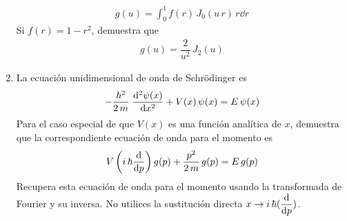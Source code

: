 \begin{enumerate}
\begin{align*}
g(u) = \int_{0}^{1} f(r) \, J_{0} (u \, r) \, r \dd{r}
\end{align*}
Si $f(r) = 1 - r^{2}$, demuestra que
\begin{align*}
g(u) = \dfrac{2}{u^{2}} \, J_{2}(u)
\end{align*}
\item La ecuación unidimensional de onda de Schrödinger es
\begin{align*}
- \dfrac{\hbar^{2}}{2 \, m} \; \dv[2]{\psi(x)}{x} +  V(x) \, \psi(x) = E \, \psi (x)
\end{align*}
Para el caso especial de que $V(x)$ es una función analítica de $x$, demuestra que la correspondiente ecuación de onda para el momento es
\begin{align*}
V \left( i \, \hbar \dv{p} \right) g(p) + \dfrac{p^{2}}{2 \, m} \, g(p) =  E \, g(p)
\end{align*}
Recupera esta ecuación de onda para el momento usando la transformada de Fourier y su inversa. No utilices la sustitución directa $\displaystyle{x \to i \, \hbar (\dv{p})}$.
\end{enumerate}
